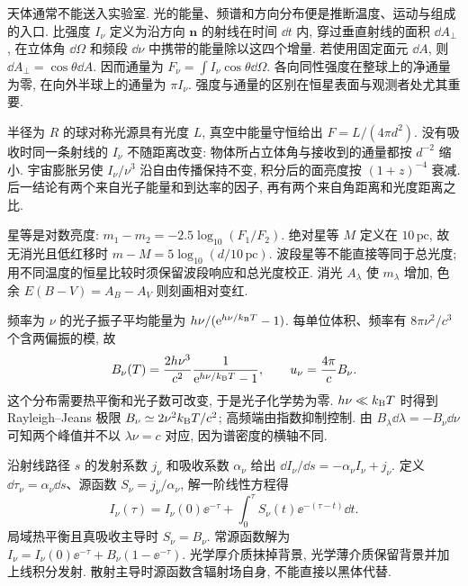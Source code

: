\label{ch:radiation}
天体通常不能送入实验室. 光的能量、频谱和方向分布便是推断温度、运动与组成的入口. 比强度 $I_\nu$ 定义为沿方向 $\boldsymbol n$ 的射线在时间 $\dd t$ 内, 穿过垂直射线的面积 $\dd A_\perp$, 在立体角 $\dd\Omega$ 和频段 $\dd\nu$ 中携带的能量除以这四个增量. 若使用固定面元 $\dd A$, 则 $\dd A_\perp=\cos\theta\dd A$. 因而通量为 $F_\nu=\int I_\nu\cos\theta\dd\Omega$. 各向同性强度在整球上的净通量为零, 在向外半球上的通量为 $\pi I_\nu$. 强度与通量的区别在恒星表面与观测者处尤其重要.

半径为 $R$ 的球对称光源具有光度 $L$, 真空中能量守恒给出 $F=L/(4\pi d^2)$. 没有吸收时同一条射线的 $I_\nu$ 不随距离改变: 物体所占立体角与接收到的通量都按 $d^{-2}$ 缩小. 宇宙膨胀另使 $I_\nu/\nu^3$ 沿自由传播保持不变, 积分后的面亮度按 $(1+z)^{-4}$ 衰减. 后一结论有两个来自光子能量和到达率的因子, 再有两个来自角距离和光度距离之比.

星等是对数亮度: $m_1-m_2=-2.5\log_{10}(F_1/F_2)$. 绝对星等 $M$ 定义在 $10\,\mathrm{pc}$, 故无消光且低红移时 $m-M=5\log_{10}(d/10\,\mathrm{pc})$. 波段星等不能直接等同于总光度; 用不同温度的恒星比较时须保留波段响应和总光度校正. 消光 $A_\lambda$ 使 $m_\lambda$ 增加, 色余 $E(B-V)=A_B-A_V$ 则刻画相对变红.

频率为 $\nu$ 的光子振子平均能量为 $h\nu/(\mathrm e^{h\nu/k_{\mathrm B} T}-1)$. 每单位体积、频率有 $8\pi\nu^2/c^3$ 个含两偏振的模, 故
\begin{equation}\label{eq:planck}
B_\nu(T)=\frac{2h\nu^3}{c^2}\frac1{\mathrm e^{h\nu/k_{\mathrm B} T}-1},\qquad
u_\nu=\frac{4\pi}{c}B_\nu.
\end{equation}
这个分布需要热平衡和光子数可改变, 于是光子化学势为零. $h\nu\ll k_{\mathrm B} T$ 时得到 Rayleigh--Jeans 极限 $B_\nu\simeq2\nu^2k_{\mathrm B} T/c^2$; 高频端由指数抑制控制. 由 $B_\lambda\dd\lambda=-B_\nu\dd\nu$ 可知两个峰值并不以 $\lambda\nu=c$ 对应, 因为谱密度的横轴不同.

沿射线路径 $s$ 的发射系数 $j_\nu$ 和吸收系数 $\alpha_\nu$ 给出 $\dd I_\nu/\dd s=-\alpha_\nu I_\nu+j_\nu$. 定义 $\dd\tau_\nu=\alpha_\nu\dd s$、源函数 $S_\nu=j_\nu/\alpha_\nu$, 解一阶线性方程得
\begin{equation}
I_\nu(\tau)=I_\nu(0)\ee^{-\tau}+\int_0^\tau S_\nu(t)\ee^{-(\tau-t)}\dd t.
\end{equation}
局域热平衡且真吸收主导时 $S_\nu=B_\nu$. 常源函数解为 $I_\nu=I_\nu(0)\ee^{-\tau}+B_\nu(1-\ee^{-\tau})$. 光学厚介质抹掉背景, 光学薄介质保留背景并加上线积分发射. 散射主导时源函数含辐射场自身, 不能直接以黑体代替.

